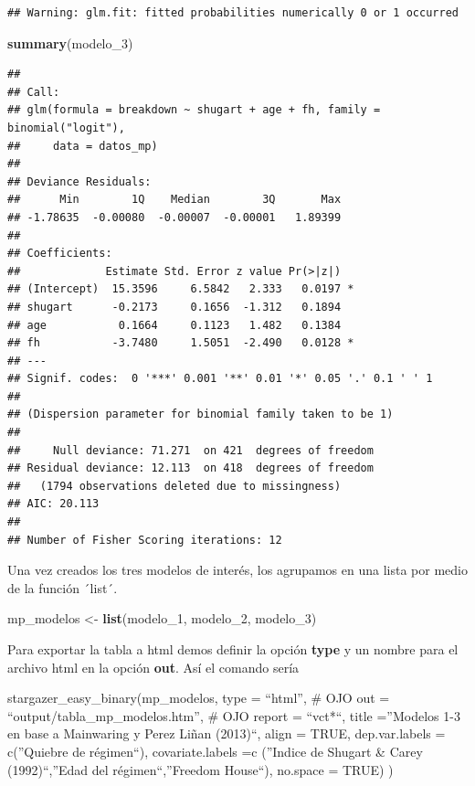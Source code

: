 \documentclass[]{book}
\newenvironment{Shaded}{\begin{snugshade}}{\end{snugshade}}
\newcommand{\KeywordTok}[1]{\textcolor[rgb]{0.13,0.29,0.53}{\textbf{#1}}}
\newcommand{\DecValTok}[1]{\textcolor[rgb]{0.00,0.00,0.81}{#1}}
\newcommand{\StringTok}[1]{\textcolor[rgb]{0.31,0.60,0.02}{#1}}
\newcommand{\NormalTok}[1]{#1}
\begin{document}
\begin{verbatim}
## Warning: glm.fit: fitted probabilities numerically 0 or 1 occurred
\end{verbatim}

\begin{Shaded}
\begin{Highlighting}[]
\KeywordTok{summary}\NormalTok{(modelo_}\DecValTok{3}\NormalTok{)}
\end{Highlighting}
\end{Shaded}

\begin{verbatim}
## 
## Call:
## glm(formula = breakdown ~ shugart + age + fh, family = binomial("logit"), 
##     data = datos_mp)
## 
## Deviance Residuals: 
##      Min        1Q    Median        3Q       Max  
## -1.78635  -0.00080  -0.00007  -0.00001   1.89399  
## 
## Coefficients:
##             Estimate Std. Error z value Pr(>|z|)  
## (Intercept)  15.3596     6.5842   2.333   0.0197 *
## shugart      -0.2173     0.1656  -1.312   0.1894  
## age           0.1664     0.1123   1.482   0.1384  
## fh           -3.7480     1.5051  -2.490   0.0128 *
## ---
## Signif. codes:  0 '***' 0.001 '**' 0.01 '*' 0.05 '.' 0.1 ' ' 1
## 
## (Dispersion parameter for binomial family taken to be 1)
## 
##     Null deviance: 71.271  on 421  degrees of freedom
## Residual deviance: 12.113  on 418  degrees of freedom
##   (1794 observations deleted due to missingness)
## AIC: 20.113
## 
## Number of Fisher Scoring iterations: 12
\end{verbatim}

Una vez creados los tres modelos de interés, los agrupamos en una lista
por medio de la función ´list´.

\begin{Shaded}
\begin{Highlighting}[]
\NormalTok{mp_modelos <-}\StringTok{ }\KeywordTok{list}\NormalTok{(modelo_}\DecValTok{1}\NormalTok{, }
\NormalTok{                   modelo_}\DecValTok{2}\NormalTok{,}
\NormalTok{                   modelo_}\DecValTok{3}\NormalTok{)}
\end{Highlighting}
\end{Shaded}

Para exportar la tabla a html demos definir la opción \textbf{type} y un
nombre para el archivo html en la opción \textbf{out}. Así el comando
sería

stargazer\_easy\_binary(mp\_modelos, type = ``html'', \# OJO out =
``output/tabla\_mp\_modelos.htm'', \# OJO report = ``vct*``, title
=''Modelos 1-3 en base a Mainwaring y Perez Liñan (2013)``, align =
TRUE, dep.var.labels = c(''Quiebre de régimen``), covariate.labels =c
(''Indice de Shugart \& Carey (1992)``,''Edad del régimen``,''Freedom
House``), no.space = TRUE) )
\end{document}
